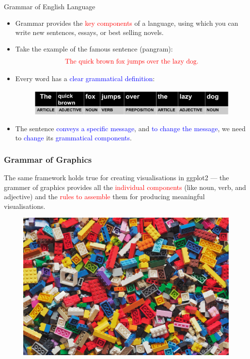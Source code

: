 \documentclass{beamer}
\begin{document}
\begin{frame}{Grammar of English Language}
\begin{itemize}
\item Grammar provides the \textcolor{red}{key components} of a language, using which you can write
new sentences, essays, or best selling novels.
\item Take the example of the famous sentence (pangram):
\begin{equation*}
\text{\textcolor{red}{The quick brown fox jumps over the lazy dog.}}
\end{equation*}
\item Every word has a \textcolor{blue}{clear grammatical definition}:
\begin{figure}
\includegraphics[width=0.99\linewidth]{PlotsLec2/QuickBrownFox}
\end{figure}
\item The sentence \textcolor{blue}{conveys a specific message}, and \textcolor{blue}{to change the message}, we need to \textcolor{blue}{change} its \textcolor{blue}{grammatical components}.
\end{itemize}
\end{frame}

\begin{frame}\frametitle{Grammar of Graphics}
The same framework holds true for creating visualisations in ggplot2 --- the grammer of graphics provides all the \textcolor{red}{individual components} (like noun, verb, and adjective) and the \textcolor{red}{rules to assemble} them for producing meaningful visualisations.
\begin{figure}
\includegraphics[width=0.75\linewidth]{PlotsLec2/Lego}
\end{figure}
\end{frame}
\end{document}
